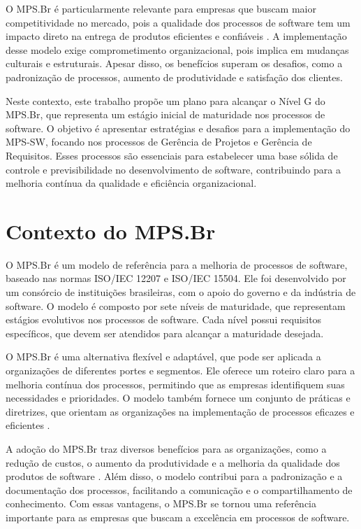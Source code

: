 \documentclass[
	12pt,				%
	oneside,			%
	a4paper,			%
	english,			%
	brazil				%
	]{abntex2unama}
\begin{document}
O MPS.Br é particularmente relevante para empresas que buscam maior competitividade no mercado, pois a qualidade dos processos de software tem um impacto direto na entrega de produtos eficientes e confiáveis \cite{mpsbr_benefits}. A implementação desse modelo exige comprometimento organizacional, pois implica em mudanças culturais e estruturais. Apesar disso, os benefícios superam os desafios, como a padronização de processos, aumento de produtividade e satisfação dos clientes.

Neste contexto, este trabalho propõe um plano para alcançar o Nível G do MPS.Br, que representa um estágio inicial de maturidade nos processos de software. O objetivo é apresentar estratégias e desafios para a implementação do MPS-SW, focando nos processos de Gerência de Projetos e Gerência de Requisitos. Esses processos são essenciais para estabelecer uma base sólida de controle e previsibilidade no desenvolvimento de software, contribuindo para a melhoria contínua da qualidade e eficiência organizacional.

\chapter{Contexto do MPS.Br}
O MPS.Br é um modelo de referência para a melhoria de processos de software, baseado nas normas ISO/IEC 12207 e ISO/IEC 15504. Ele foi desenvolvido por um consórcio de instituições brasileiras, com o apoio do governo e da indústria de software. O modelo é composto por sete níveis de maturidade, que representam estágios evolutivos nos processos de software. Cada nível possui requisitos específicos, que devem ser atendidos para alcançar a maturidade desejada. \cite{iso12207, iso15504}

O MPS.Br é uma alternativa flexível e adaptável, que pode ser aplicada a organizações de diferentes portes e segmentos. Ele oferece um roteiro claro para a melhoria contínua dos processos, permitindo que as empresas identifiquem suas necessidades e prioridades. O modelo também fornece um conjunto de práticas e diretrizes, que orientam as organizações na implementação de processos eficazes e eficientes \cite{mpsbr_guide}.

A adoção do MPS.Br traz diversos benefícios para as organizações, como a redução de custos, o aumento da produtividade e a melhoria da qualidade dos produtos de software \cite{mpsbr_benefits}. Além disso, o modelo contribui para a padronização e a documentação dos processos, facilitando a comunicação e o compartilhamento de conhecimento. Com essas vantagens, o MPS.Br se tornou uma referência importante para as empresas que buscam a excelência em processos de software.
\end{document}
